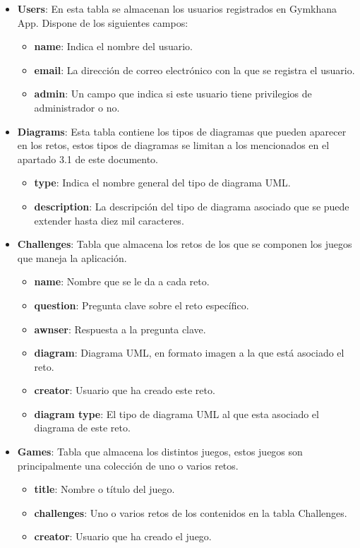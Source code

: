 \documentclass[a4paper, 12pt]{book}
\begin{document}
\begin{itemize}
	\item \textbf {Users}: En esta tabla se almacenan los usuarios registrados en Gymkhana App. Dispone de los siguientes campos: 
	\begin{itemize}
		\item \textbf {name}: Indica el nombre del usuario. 
		\item \textbf {email}: La dirección de correo electrónico con la que se registra el usuario. 
		\item \textbf {admin}: Un campo que indica si este usuario tiene privilegios de administrador o no. 
	\end{itemize}

	\item \textbf {Diagrams}: Esta tabla contiene los tipos de diagramas que pueden aparecer en los retos, estos tipos de diagramas se limitan a los mencionados en el apartado 3.1 de este documento.  
	\begin{itemize}
		\item \textbf {type}: Indica el nombre general del tipo de diagrama UML. 
		\item \textbf {description}: La descripción del tipo de diagrama asociado que se puede extender hasta diez mil caracteres. 
	\end{itemize}
	
	\item \textbf {Challenges}: Tabla que almacena los retos de los que se componen los juegos que maneja la aplicación. 
	\begin{itemize}
		\item \textbf {name}: Nombre que se le da a cada reto.
		\item \textbf {question}: Pregunta clave sobre el reto específico. 
		\item \textbf {awnser}: Respuesta a la pregunta clave. 
		\item \textbf {diagram}: Diagrama UML, en formato imagen a la que está asociado el reto. 
		\item \textbf {creator}: Usuario que ha creado este reto. 
		\item \textbf {diagram type}: El tipo de diagrama UML al que esta asociado el diagrama de este reto. 
	\end{itemize}
	
	\item \textbf {Games}: Tabla que almacena los distintos juegos, estos juegos son principalmente una colección de uno o varios retos. 
	\begin{itemize}
		\item \textbf {title}: Nombre o título del juego. 
		\item \textbf {challenges}: Uno o varios retos de los contenidos en la tabla Challenges. 
		\item \textbf {creator}: Usuario que ha creado el juego. 
	\end{itemize}
	
\end{itemize}
\end{document}
